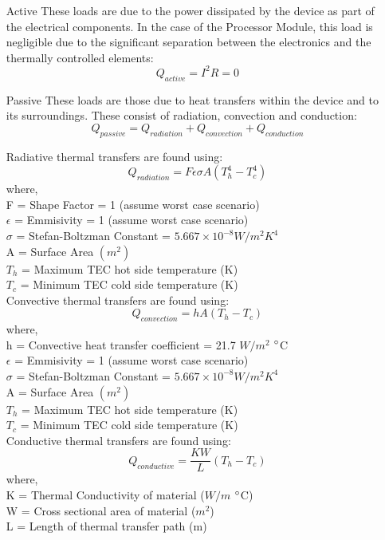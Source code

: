 \begin{enumerate}
	\item [Active] These loads are due to the power dissipated by the device as part of the electrical components. In the case of the Processor Module, this load is negligible due to the significant separation between the electronics and the thermally controlled elements:
	$$Q_{active} = I^2R = 0 $$ 
	\item[Passive] These loads are those due to heat transfers within the device and to its surroundings. These consist of radiation, convection and conduction:
	\begin{equation}
	\label{eq_passive}
	Q_{passive} = Q_{radiation} + Q_{convection} + Q_{conduction}
	\end{equation}
	
	Radiative thermal transfers are found using:
	\begin{equation}
	\label{eq_rad}
	Q_{radiation} = F\epsilon\sigma A(T_h^4 - T_c^4)
	\end{equation} 	
	where,\\
	F = Shape Factor = 1 (assume worst case scenario)\\
	$\epsilon$ = Emmisivity = 1 (assume worst case scenario)\\
	$\sigma$ = Stefan-Boltzman Constant = $5.667\times10^{-8} W/m^2K^4$\\
	A = Surface Area $(m^2)$\\
	$T_h$ = Maximum TEC hot side temperature (K)\\
	$T_c$ =  Minimum TEC cold side temperature (K)\\
	
	Convective thermal transfers are found using:
	\begin{equation}
	\label{eq_cov}
	Q_{convection} = hA(T_h - T_c)
	\end{equation} 	
	where,\\
	h = Convective heat transfer coefficient = 21.7 $W/m^2$ $\degree$C\\
	$\epsilon$ = Emmisivity = 1 (assume worst case scenario)\\
	$\sigma$ = Stefan-Boltzman Constant = $5.667\times10^{-8} W/m^2K^4$\\
	A = Surface Area $(m^2)$\\
	$T_h$ = Maximum TEC hot side temperature (K)\\
	$T_c$ = Minimum TEC cold side temperature (K)\\

	Conductive thermal transfers are found using:
	\begin{equation}
	\label{eq_cond}
	Q_{conductive} = \frac{KW}{L}(T_h - T_c)
	\end{equation} 	
	where,\\
	K = Thermal Conductivity of material ($W/m$ $\degree$C)\\
	W = Cross sectional area of material ($m^2$)\\
	L = Length of thermal transfer path (m)\\
	 
\end{enumerate}

